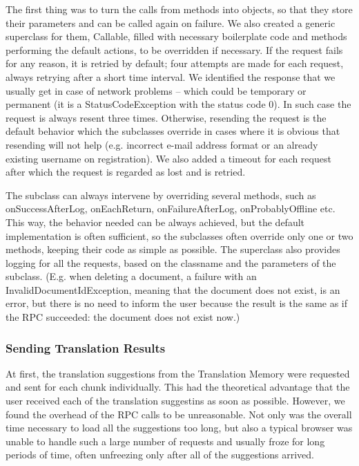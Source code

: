 The first thing was to turn the calls from methods into objects, so that they store their parameters and can be called again on failure. We also created a generic superclass for them, Callable, filled with necessary boilerplate code and methods performing the default actions, to be overridden if necessary. If the request fails for any reason, it is retried by default; four attempts are made for each request, always retrying after a short time interval. We identified the response that we usually get in case of network problems -- which could be temporary or permanent (it is a StatusCodeException with the status code 0). In such case the request is always resent three times. Otherwise, resending the request is the default behavior which the subclasses override in cases where it is obvious that resending will not help (e.g. incorrect e-mail address format or an already existing username on registration). We also added a timeout for each request after which the request is regarded as lost and is retried.

The subclass can always intervene by overriding several methods, such as onSuccessAfterLog, onEachReturn, onFailureAfterLog, onProbablyOffline etc. This way, the behavior needed can be always achieved, but the default implementation is often sufficient, so the subclasses often override only one or two methods, keeping their code as simple as possible. The superclass also provides logging for all the requests, based on the classname and the parameters of the subclass.
(E.g. when deleting a document, a failure with an InvalidDocumentIdException, meaning that the document does not exist, is an error, but there is no need to inform the user because the result is the same as if the RPC succeeded: the document does not exist now.)

\subsubsection{Sending Translation Results}

At first, the translation suggestions from the Translation Memory were requested and sent for each chunk individually. This had the theoretical advantage that the user received each of the translation suggestins as soon as possible. However, we found the overhead of the RPC calls to be unreasonable. Not only was the overall time necessary to load all the suggestions too long, but also a typical browser was unable to handle such a large number of requests and usually froze for long periods of time, often unfreezing only after all of the suggestions arrived.

